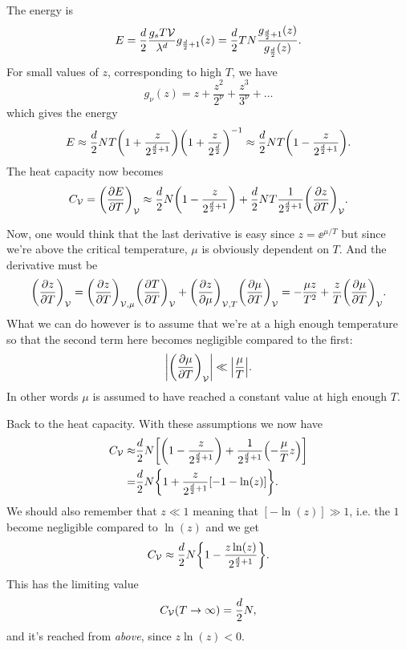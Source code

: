 \documentclass[11pt,letter, swedish, english
]{article}
\begin{document}
The energy is 
\begin{equation}\label{eq:4e_E}
E=\frac{d}{2}\frac{g_sT\mathcal{V}}{\lambda^d}g_{\frac{d}{2}+1}(z)
=\frac{d}{2}TN\frac{g_{\frac{d}{2}+1}(z)}{g_{\frac{d}{2}}(z)}.
\end{equation}
For small values of $z$, corresponding to high
$T$, we have
\begin{equation}
g_\nu(z)=z+\frac{z^2}{2^\nu}+\frac{z^3}{3^\nu}+\ldots
\end{equation}
which gives the energy
\begin{equation}
E\approx \frac{d}{2}NT
\qty(1+\frac{z}{2^{\frac{d}{2}+1}})\qty(1+\frac{z}{2^{\frac{d}{2}}})^{-1}
\approx\frac{d}{2}NT \qty(1-\frac{z}{2^{\frac{d}{2}+1}}).
\end{equation}
The heat capacity now becomes
\begin{equation}
C_{\mathcal{V}}=\qty(\pdv{E}{T})_{\mathcal{V}}\approx
\frac{d}{2}N \qty(1-\frac{z}{2^{\frac{d}{2}+1}})
+\frac{d}{2}NT \frac{1}{2^{\frac{d}{2}+1}}\qty(\pdv{z}{T})_{\mathcal{V}}.
\end{equation}

Now, one would think that the last derivative is easy since
$z=\ee^{\mu/T}$ but since we're above the critical temperature, $\mu$
is obviously dependent on $T$. And the derivative must be
\begin{equation}
\qty(\pdv{z}{T})_{\mathcal{V}}
=\qty(\pdv{z}{T})_{\mathcal{V},\mu}\qty(\pdv{T}{T})_{\mathcal{V}}
+\qty(\pdv{z}{\mu})_{\mathcal{V},T}\qty(\pdv{\mu}{T})_{\mathcal{V}}
=-\frac{\mu z}{T^2} + \frac{z}{T}\qty(\pdv{\mu}{T})_{\mathcal{V}}.
\end{equation}
What we can do however is to assume that we're at a high enough
temperature so that the second term here becomes negligible compared
to the first:
\begin{equation}
\abs{\qty(\pdv{\mu}{T})_{\mathcal{V}}}\ll\abs{\frac{\mu}{T}}.
\end{equation}
In other words $\mu$ is assumed to have reached a constant value at
high enough $T$.

Back to the heat capacity. With these assumptions we now have
\begin{equation}
\begin{aligned}
C_{\mathcal{V}}\approx&
\frac{d}{2}N\qty[ \qty(1-\frac{z}{2^{\frac{d}{2}+1}})
+\frac{1}{2^{\frac{d}{2}+1}}\qty(-\frac{\mu}{T}z)]\\
=& \frac{d}{2}N\qty{1+\frac{z}{2^{\ensuremath{\frac{d}{2}}+1}}\qty[-1-\ln(z)]}.
\end{aligned}
\end{equation}
We should also remember that $z\ll1$ meaning that $[-\ln(z)]\gg1$,
i.e. the $1$ become negligible compared to $\ln(z)$ and we get
\begin{equation}
C_{\mathcal{V}}\approx
\frac{d}{2}N\qty{1-\frac{z\ln(z)}{2^{\ensuremath{\frac{d}{2}}+1}}}.
\end{equation}
This has the limiting value
\begin{equation}\label{eq:4_Cv_infty}
C_{\mathcal{V}}(T\to\infty)=\frac{d}{2}N,
\end{equation}
and it's reached from \emph{above}, since $z\ln(z)<0$.
\end{document}
